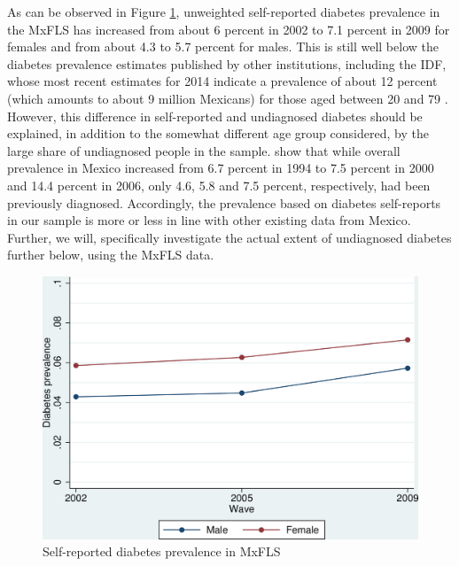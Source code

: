 \documentclass[12pt,english,british]{article}
\begin{document}
As can be observed in Figure \ref{fig:Self-reported-diabetes-prevalenc},
unweighted self-reported diabetes prevalence in the \ac{MxFLS}
has increased from about 6 percent in 2002 to 7.1 percent in 2009
for females and from about 4.3 to 5.7 percent for males. This is
still well below the diabetes prevalence estimates published by other
institutions, including the \ac{IDF}, whose most recent estimates
for 2014 indicate a prevalence of about 12 percent (which amounts
to about 9 million Mexicans) for those aged between 20 and 79 \citep{InternationalDiabetesFederation2013}.
However, this difference in self-reported and undiagnosed diabetes should be explained, in addition to the somewhat different
age group considered, by the large share of undiagnosed people in the sample. \citet{Barquera2013} show that while overall prevalence in Mexico increased from 6.7 percent in 1994 to 7.5 percent in 2000 and 14.4 percent in 2006, only 4.6, 5.8 and 7.5 percent, respectively, had been previously diagnosed. Accordingly, the prevalence based on diabetes self-reports in our sample is more or less in line with other existing data from Mexico. Further, we will, specifically investigate the actual extent of undiagnosed diabetes further below, using the MxFLS data.



\begin{figure}[h!]
\begin{center}
\includegraphics[width=0.7\columnwidth]{figures/diabetes_prevalence1/diabetes_prevalence1}
\end{center}
\caption{\label{fig:Self-reported-diabetes-prevalenc}Self-reported diabetes
prevalence in MxFLS}
\end{figure}
\end{document}
